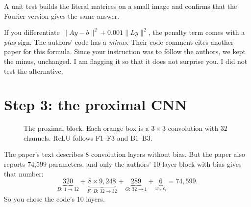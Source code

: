 A unit test builds the literal matrices on a small image and confirms that the Fourier version gives the same answer.

\begin{careful}
If you differentiate $\lVert Ay-b\rVert^2+0.001\lVert Ly\rVert^2$, the penalty term comes with a \emph{plus} sign. The authors'
code has a \emph{minus}. Their code comment cites another paper for this formula. Since your instruction was to
follow the authors, we kept the minus, unchanged. I am flagging it so that it does not surprise you. I did not
test the alternative.
\end{careful}

\section{Step 3: the proximal CNN}

\begin{figure}[H]
\centering
{}
\caption{The proximal block. Each orange box is a $3\times3$ convolution with 32 channels. ReLU follows F1--F3 and B1--B3.}
\end{figure}

The paper's text describes 8 convolution layers without bias. But the paper also reports 74,599 parameters, and only the
authors' 10-layer block with bias gives that number:
\begin{equation}
\underbrace{320}_{D:\,1\to32} + \underbrace{8\times9{,}248}_{F,\,B:\,32\to32} + \underbrace{289}_{G:\,32\to1}
+ \underbrace{6}_{w_i,\,c_i} = 74{,}599.
\end{equation}
So you chose the code's 10 layers.

